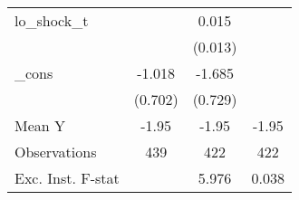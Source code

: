 {\begin{tabular}{l*{3}{c}}
\addlinespace
lo\_shock\_t  &                     &       0.015         &                     \\
            &                     &     (0.013)         &                     \\
\addlinespace
\_cons      &      -1.018         &      -1.685\sym{**} &                     \\
            &     (0.702)         &     (0.729)         &                     \\
\midrule
Mean Y      &       -1.95         &       -1.95         &       -1.95         \\
Observations&         439         &         422         &         422         \\
Exc. Inst. F-stat&                     &       5.976         &       0.038         \\
\bottomrule
\end{tabular}
}
